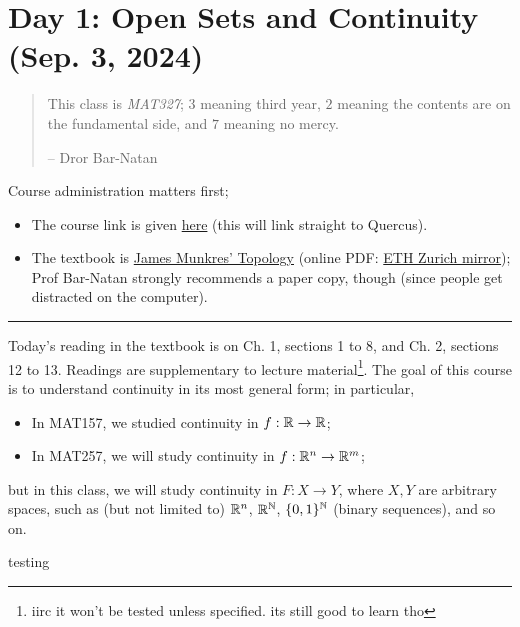 \section{Day 1: Open Sets and Continuity (Sep. 3, 2024)}
\begin{abstract}
    \sffamily\small
    \noindent This class is \textit{MAT327}; $3$ meaning third year, $2$ meaning the contents are on the fundamental side, and $7$ meaning no mercy.

    -- Dror Bar-Natan
\end{abstract}

Course administration matters first;
\begin{itemize}
    \item The course link is given \href{https://drorbn.net/24-327}{here} (this will link straight to Quercus).
    \item The textbook is \href{https://www.pearson.com/en-ca/subject-catalog/p/topology-classic-version/P200000006299/9780137848669}{James Munkres' Topology} (online PDF: \href{https://people.math.ethz.ch/~dkosanovic/24-FS/Munkres-Topology.pdf}{ETH Zurich mirror}); Prof Bar-Natan strongly recommends a paper copy, though (since people get distracted on the computer).
\end{itemize}

\hrule \bigskip

\noindent Today's reading in the textbook is on Ch. 1, sections 1 to 8, and Ch. 2, sections 12 to 13. Readings are supplementary to lecture material\footnote{iirc it won't be tested unless specified. its still good to learn tho}. The goal of this course is to understand continuity in its most general form; in particular,
\begin{itemize}
    \item In MAT157, we studied continuity in $f : \mathbb R \to \mathbb R$;
    \item In MAT257, we will study continuity in $f : \mathbb R^n \to \mathbb R^m$;
\end{itemize} 
but in this class, we will study continuity in $F : X \to Y$, where $X, Y$ are arbitrary spaces, such as (but not limited to) $\mathbb R^n$, $\mathbb R^\mathbb N$, $\{0, 1\}^\mathbb N$ (binary sequences), and so on.

testing